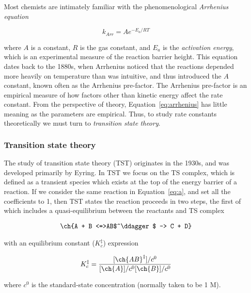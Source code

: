 Most chemists are intimately familiar with the phenomenological \emph{Arrhenius equation}

\begin{equation}
  k_{Arr} = Ae^{-E_a/RT}
\label{eq:arrhenius}
\end{equation}

\noindent where $A$ is a constant, $R$ is the gas constant, and $E_a$ is the \emph{activation energy}, which is an experimental measure of the reaction barrier height. This equation dates back to the 1880s, when Arrhenius noticed that the reactions depended more heavily on temperature than was intuitive, and thus introduced the $A$ constant, known often as the Arrhenius pre-factor.\cite{McQuarrie1997} The Arrhenius pre-factor is an empirical measure of how factors other than kinetic energy affect the rate constant. From the perspective of theory, Equation~\ref{eq:arrhenius} has little meaning as the parameters are empirical. Thus, to study rate constants theoretically we must turn to \emph{transition state theory}.

\subsubsection{Transition state theory}

The study of transition state theory (TST) originates in the 1930s, and was developed primarily by Eyring.\cite{McQuarrie1997,Steinfeld1998} In TST we focus on the TS complex, which is defined as a transient species which exists at the top of the energy barrier of a reaction. If we consider the same reaction in Equation~\ref{eq:a}, and set all the coefficients to 1, then TST states the reaction proceeds in two steps, the first of which includes a quasi-equilibrium between the reactants and TS complex

\begin{equation}
  \ch{A + B <=>AB$^\ddagger$ -> C + D}
  \label{eq:tst}
\end{equation}

\noindent with an equilibrium constant ($K_c^{\ddagger}$) expression

\begin{equation}
  K_c^{\ddagger} = \frac{[\ch{AB}^\ddagger]/c^0}{[\ch{A}]/c^0[\ch{B}]/c^0}
\label{eq:K}
\end{equation}

\noindent where $c^0$ is the standard-state concentration (normally taken to be 1 M).

